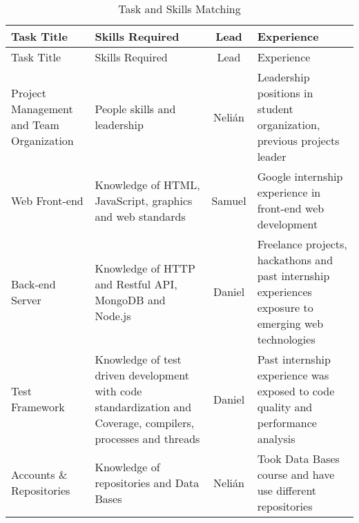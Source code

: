 \label{sec:skills}

\begin{center}
\setlength{\extrarowheight}{1.5pt}
  \begin{longtable}{|m{3cm}|m{5cm}|c|m{5cm}|}
 \caption{Task and Skills Matching} \\
   \hline
  
  \centering Task Title & Skills Required & Lead & Experience \\
  \hline \hline \endfirsthead
  
     \hline

	\centering Task Title & Skills Required & Lead & Experience \\  
	\hline \hline \endhead
  
  \endfoot  
  
  Project Management and Team Organization & People skills and leadership & Nelián & Leadership positions in student organization, previous projects leader\\ \hline
  Web Front-end & Knowledge of HTML, JavaScript, graphics and web standards & Samuel & Google internship experience in front-end web development\\ \hline
  Back-end Server & Knowledge of HTTP and Restful API, MongoDB and Node.js & Daniel & Freelance projects, hackathons and past internship experiences exposure to emerging web technologies \\ \hline
  Test Framework & Knowledge of test driven development with code standardization and Coverage, compilers, processes and threads & Daniel & Past internship experience was exposed to code quality and performance analysis\\ \hline
  Accounts \& Repositories & Knowledge of repositories and Data Bases & Nelián & Took Data Bases course and have use different repositories\\ \hline
   \end{longtable}
\end{center}